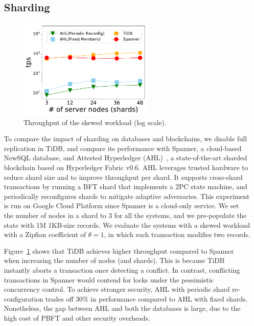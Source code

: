 \subsection{Sharding}
\label{sec:twin:exp:shard}

\begin{figure}[tp]

	\centering
	\includegraphics[width=0.6\textwidth]{chart/twin/skewed-scale.pdf}
	\caption{Throughput of the skewed workload (log scale).}
	\label{chart:twin:shard}
\end{figure}

To compare the impact of sharding on databases and blockchains, we disable full
replication in TiDB, and compare its performance with Spanner, a cloud-based
NewSQL database, and Attested Hyperledger (AHL)~\cite{dang2018towards}, a
state-of-the-art sharded blockchain based on Hyperledger Fabric v0.6.
AHL leverages trusted hardware to reduce shard size and to improve throughput
per shard.
It supports cross-shard transactions by running a BFT shard that implements a
2PC state machine, and periodically reconfigures shards to mitigate adaptive
adversaries.
This experiment is run on Google Cloud Platform since Spanner is a cloud-only
service.
We set the number of nodes in a shard to 3 for all the systems, and we
pre-populate the state with 1M 1KB-size records.
We evaluate the systems with a skewed workload with a Zipfian coefficient of
$\theta=1$, in which each transaction modifies two records.

Figure~\ref{chart:twin:shard} shows that TiDB achieves higher throughput compared to
Spanner when increasing the number of nodes (and shards).
This is because TiDB instantly aborts a transaction once detecting a conflict.
In contrast, conflicting transactions in Spanner would contend for locks under
the pessimistic concurrency control.
To achieve stronger security, AHL with periodic shard re-configuration trades
off $30\%$ in performance compared to AHL with fixed shards.
Nonetheless, the gap between AHL and both the databases is large, due to the
high cost of PBFT and other security overheads.

